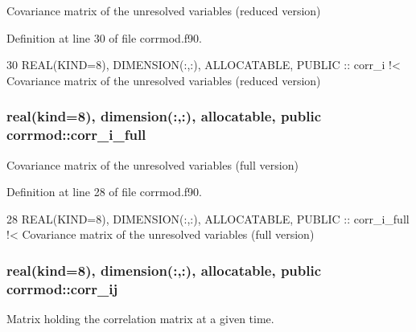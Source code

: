 Covariance matrix of the unresolved variables (reduced version) 



Definition at line 30 of file corrmod.\+f90.


\begin{DoxyCode}
30   \textcolor{keywordtype}{REAL(KIND=8)}, \textcolor{keywordtype}{DIMENSION(:,:)}, \textcolor{keywordtype}{ALLOCATABLE}, \textcolor{keywordtype}{PUBLIC} :: corr\_i\textcolor{comment}{ !< Covariance matrix of the unresolved
       variables (reduced version)}
\end{DoxyCode}
\subsubsection[{\texorpdfstring{corr\+\_\+i\+\_\+full}{corr_i_full}}]{\setlength{\rightskip}{0pt plus 5cm}real(kind=8), dimension(\+:,\+:), allocatable, public corrmod\+::corr\+\_\+i\+\_\+full}\hypertarget{namespacecorrmod_a978b78f1d6906afe06e63768535b44f7}{}\label{namespacecorrmod_a978b78f1d6906afe06e63768535b44f7}


Covariance matrix of the unresolved variables (full version) 



Definition at line 28 of file corrmod.\+f90.


\begin{DoxyCode}
28   \textcolor{keywordtype}{REAL(KIND=8)}, \textcolor{keywordtype}{DIMENSION(:,:)}, \textcolor{keywordtype}{ALLOCATABLE}, \textcolor{keywordtype}{PUBLIC} :: corr\_i\_full\textcolor{comment}{ !< Covariance matrix of the unresolved
       variables (full version)}
\end{DoxyCode}
\subsubsection[{\texorpdfstring{corr\+\_\+ij}{corr_ij}}]{\setlength{\rightskip}{0pt plus 5cm}real(kind=8), dimension(\+:,\+:), allocatable, public corrmod\+::corr\+\_\+ij}\hypertarget{namespacecorrmod_ad9983e0594dec7351fe398f0f2225c6f}{}\label{namespacecorrmod_ad9983e0594dec7351fe398f0f2225c6f}


Matrix holding the correlation matrix at a given time. 



